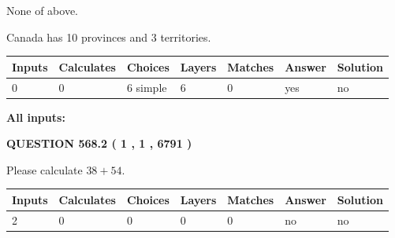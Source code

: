 \documentclass[12pt]{article}
\begin{document}
 
 None of above.
 
 
\noindent{}
 
 
Canada has 10  provinces and 3 territories.
 
 
\noindent{}
 
 
   
   
   
   
\noindent\begin{tabular}{|l|l|l|l|l|l|l|}
 \hline
Inputs & Calculates & Choices & Layers & Matches & Answer & Solution \\ \hline
 0  & 
 0  & 
 6
  simple  
  & 
 6  & 
 0  & 
  yes & 
  no 
  \\ \hline
 \end{tabular}
   
   
   
   
\noindent{}
   
   
   
   
\noindent\vspace{0.1in}\hspace{-0.08in} {\textbf{\Large{All inputs: }}}
   
   
  
\vspace{0.2in}
  
{\textbf{\Large{QUESTION
568.2 
 ( 1 , 1 , 6791 )
}}}
  
  
 
Please calculate $ %
38 +  %
54 $.
 
 
   
   
   
   
\noindent\begin{tabular}{|l|l|l|l|l|l|l|}
 \hline
Inputs & Calculates & Choices & Layers & Matches & Answer & Solution \\ \hline
 2  & 
 0  & 
 0
  & 
 0  & 
 0  & 
  no & 
  no 
  \\ \hline
 \end{tabular}
   
   
   
   
\noindent{}
   
\end{document}

